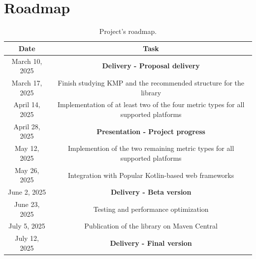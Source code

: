 \documentclass[a4paper,twoside,11pt]{article}
\begin{document}
\section{Roadmap}
\begin{table}[h!]
\centering
\begin{tabular}{ |c||c|  }
  \hline
  Date &Task\\
  \hline
  March 10, 2025   & \textbf{Delivery - Proposal delivery}\\
  \hline
  March 17, 2025  & Finish studying KMP and the recommended structure for the library \\
  \hline
  April 14, 2025  &Implementation of at least two of the four metric types for all supported platforms\\
  \hline
  April 28, 2025&   \textbf{Presentation - Project progress}\\
  \hline
  May 12, 2025&   Implemention of the two remaining metric types for all supported platforms\\
  \hline
  May 26, 2025&   Integration with Popular Kotlin-based web frameworks\\
  \hline
  June 2, 2025 &\textbf{Delivery - Beta version}\\
  \hline
  June 23, 2025 &Testing and performance optimization\\
  \hline
  July 5, 2025 &Publication of the library on Maven Central\\
  \hline
  July 12, 2025    &\textbf{Delivery - Final version}\\
  \hline
 \end{tabular}
 \caption{Project's roadmap.}
 \label{table:2}
\end{table}



\end{document}

